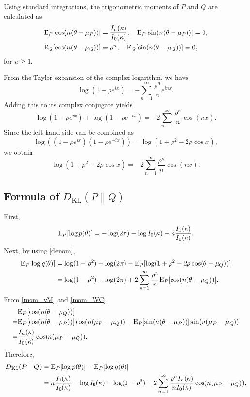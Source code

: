 \documentclass[11pt, a4paper]{article}
\begin{document}
Using standard integrations, the trigonometric moments of $P$ and $Q$ are calculated as
\begin{align}
	{\rm E}_P[\cos(n(\theta - \mu_P))] &= \frac{I_n(\kappa)}{I_0(\kappa)}, \quad {\rm E}_P[\sin(n(\theta - \mu_P))] = 0, \label{mom_vM} \\
	{\rm E}_Q[\cos(n(\theta - \mu_Q))] &= \rho^n, \quad {\rm E}_Q[\sin(n(\theta - \mu_Q))] = 0, \label{mom_WC}
\end{align}
for $n \ge 1$.

From the Taylor expansion of the complex logarithm, we have
\begin{equation*}
	\log(1 - \rho e^{ix}) = -\sum_{n=1}^\infty \frac{\rho^n}{n} e^{inx}.
\end{equation*}
Adding this to its complex conjugate yields
\begin{equation*}
	\log(1 - \rho e^{ix}) + \log(1 - \rho e^{-ix}) = -2 \sum_{n=1}^\infty \frac{\rho^n}{n} \cos(nx).
\end{equation*}
Since the left-hand side can be combined as
\begin{equation*}
	\log((1 - \rho e^{ix})(1 - \rho e^{-ix})) = \log(1 + \rho^2 - 2\rho\cos x),
\end{equation*}
we obtain
\begin{equation}\label{denom}
	\log(1 + \rho^2 - 2\rho\cos x) = -2 \sum_{n=1}^\infty \frac{\rho^n}{n} \cos(nx).
\end{equation}

\subsection{Formula of $D_{\text{KL}}(P \parallel Q)$}
First, 
\begin{equation*}
	{\rm E}_P[\log p(\theta)] = -\log(2\pi) - \log I_0(\kappa) + \kappa \frac{I_1(\kappa)}{I_0(\kappa)}.
\end{equation*}
Next, by using \eqref{denom},
\begin{align*}
	{\rm E}_P[\log q(\theta)] &= \log(1 - \rho^2) - \log(2\pi) - {\rm E}_P[\log (1 + \rho^2 - 2\rho\cos (\theta-\mu_Q))] \\
	&= \log(1 - \rho^2) - \log(2\pi) + 2 \sum_{n=1}^\infty \frac{\rho^n}{n} {\rm E}_P [\cos(n(\theta - \mu_Q))].
\end{align*}
From \eqref{mom_vM} and \eqref{mom_WC},
\begin{align*}
	&{\rm E}_P [\cos(n(\theta - \mu_Q))] \\
	=& {\rm E}_P [\cos(n(\theta - \mu_P))] \cos(n(\mu_P-\mu_Q)) - {\rm E}_P [\sin(n(\theta - \mu_P))] \sin(n(\mu_P-\mu_Q))  \\
	=& \frac{I_n(\kappa)}{I_0(\kappa)} \cos(n(\mu_P - \mu_Q)).
\end{align*}
Therefore,
\begin{align*}
	D_{\text{KL}}(P \parallel Q) &= {\rm E}_P[\log p(\theta)] - {\rm E}_P[\log q(\theta)] \\
	&= \kappa \frac{I_1(\kappa)}{I_0(\kappa)} - \log I_0(\kappa) - \log(1 - \rho^2) - 2 \sum_{n=1}^\infty \frac{\rho^n I_n(\kappa)}{n I_0(\kappa)} \cos(n(\mu_P - \mu_Q)).
\end{align*}
\end{document}
